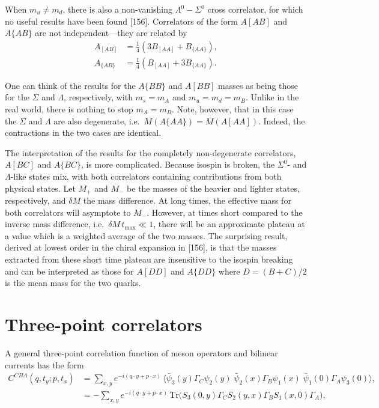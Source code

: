 When $m_u \neq m_d$, there is also a non-vanishing $\Lambda^0 - \Sigma^0$ cross
correlator, for which no useful results have been found [156].
Correlators of the form $A[AB]$ and $A\{AB\}$ are not independent---they are
related by
\begin{equation}
\begin{aligned}
A_{[AB]} &= \tfrac{1}{4}(3B_{[AA]} + B_{\{AA\}}),\\
A_{\{AB\}} &= \tfrac{1}{4}(B_{[AA]} + 3B_{\{AA\}}) .
\end{aligned}
\end{equation}

One can think of the results for the $A\{BB\}$ and $A[BB]$ masses as being
those for the $\Sigma$ and $\Lambda$, respectively, with $m_s = m_A$ and
$m_u = m_d = m_B$.  Unlike in the real world, there is nothing to stop
$m_A = m_B$.  Note, however, that in this case the $\Sigma$ and $\Lambda$ are
also degenerate, i.e.\ $M(A\{AA\}) = M(A[AA])$.  Indeed, the contractions in
the two cases are identical.

The interpretation of the results for the completely non-degenerate
correlators, $A[BC]$ and $A\{BC\}$, is more complicated.  Because isospin is
broken, the $\Sigma^0$- and $\Lambda$-like states mix, with both correlators
containing contributions from both physical states.  Let $M_+$ and $M_-$ be the
masses of the heavier and lighter states, respectively, and $\delta M$ the mass
difference.  At long times, the effective mass for both correlators will
asymptote to $M_-$.  However, at times short compared to the inverse mass
difference, i.e.\ $\delta M\,t_{\max} \ll 1$, there will be an approximate
plateau at a value which is a weighted average of the two masses.  The
surprising result, derived at lowest order in the chiral expansion in [156],
is that the masses extracted from these short time plateau are insensitive to
the isospin breaking and can be interpreted as those for $A[DD]$ and $A\{DD\}$
where $D = (B+C)/2$ is the mean mass for the two quarks.

\section{Three-point correlators}

A general three-point correlation function of meson operators and bilinear
currents has the form
\begin{equation}
\begin{aligned}
C^{CBA}(q,t_y;p,t_x) &= \sum_{x,y} e^{-i(q\cdot y+p\cdot x)}\,
   \langle \bar{\psi}_3(y)\Gamma_C\psi_2(y)\;\bar{\psi}_2(x)\Gamma_B\psi_1(x)
   \;\bar{\psi}_1(0)\Gamma_A\psi_3(0)\rangle ,\\
&= -\sum_{x,y} e^{-i(q\cdot y+p\cdot x)}\,
   \mathrm{Tr}\big(S_3(0,y)\Gamma_C S_2(y,x)\Gamma_B S_1(x,0)\Gamma_A\big) ,
\end{aligned}
\end{equation}


